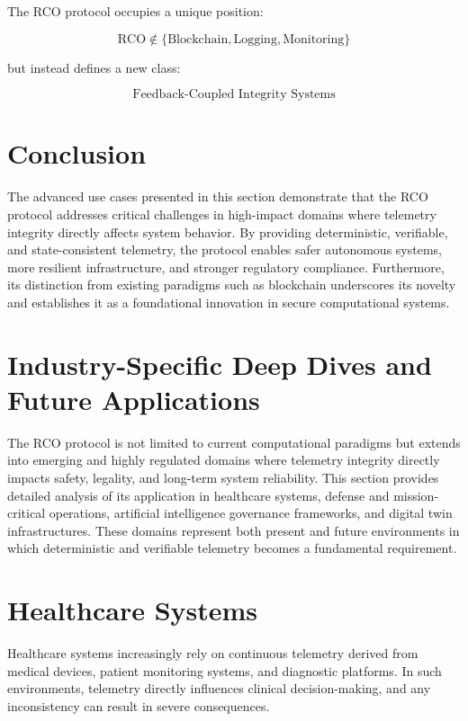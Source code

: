 The RCO protocol occupies a unique position:

\begin{equation}
\text{RCO} \notin \{\text{Blockchain}, \text{Logging}, \text{Monitoring}\}
\end{equation}

but instead defines a new class:

\begin{equation}
\text{Feedback-Coupled Integrity Systems}
\end{equation}

\section{Conclusion}

The advanced use cases presented in this section demonstrate that the RCO protocol addresses critical challenges in high-impact domains where telemetry integrity directly affects system behavior. By providing deterministic, verifiable, and state-consistent telemetry, the protocol enables safer autonomous systems, more resilient infrastructure, and stronger regulatory compliance. Furthermore, its distinction from existing paradigms such as blockchain underscores its novelty and establishes it as a foundational innovation in secure computational systems.

\section{Industry-Specific Deep Dives and Future Applications}

The RCO protocol is not limited to current computational paradigms but extends into emerging and highly regulated domains where telemetry integrity directly impacts safety, legality, and long-term system reliability. This section provides detailed analysis of its application in healthcare systems, defense and mission-critical operations, artificial intelligence governance frameworks, and digital twin infrastructures. These domains represent both present and future environments in which deterministic and verifiable telemetry becomes a fundamental requirement.

\section{Healthcare Systems}

Healthcare systems increasingly rely on continuous telemetry derived from medical devices, patient monitoring systems, and diagnostic platforms. In such environments, telemetry directly influences clinical decision-making, and any inconsistency can result in severe consequences.


